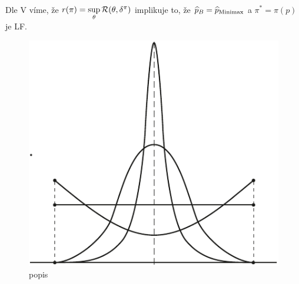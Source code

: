 \begin{remark}
\begin{enumerate}[1)]
\begin{enumerate}[a)]
\[\begin{split}
			\end{split}
			\] 
			Dle V víme, že $r(\pi)=\sup\limits_{\theta}\mathcal{R}(\theta,\delta^\pi)$ implikuje to, že $\widehat{p}_B=\widehat{p}_\mathrm{Minimax}$ a $\pi^\ast=\pi(p)$ je LF.
			\begin{figure}[h]
				\centering
				\includegraphics[width=0.5\linewidth]{pictures/9_1.pdf}
				\caption{popis}
				\label{fig:91}
			\end{figure}			
		\end{enumerate}
	\end{enumerate}
\end{remark}	
	
